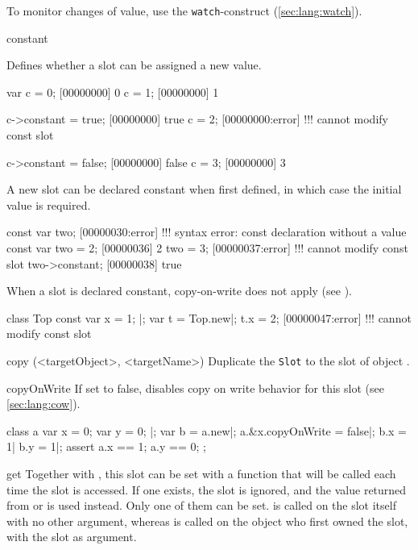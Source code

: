 \begin{urbiscriptapi}
To monitor changes of value, use the \lstinline{watch}-construct
(\autoref{sec:lang:watch}).


\item[constant]

Defines whether a slot can be assigned a new value.

\begin{urbiscript}
var c = 0;
[00000000] 0
c = 1;
[00000000] 1

c->constant = true;
[00000000] true
c = 2;
[00000000:error] !!! cannot modify const slot

c->constant = false;
[00000000] false
c = 3;
[00000000] 3
\end{urbiscript}

A new slot can be declared constant when first defined, in which case the
initial value is required.

\begin{urbiscript}
const var two;
[00000030:error] !!! syntax error: const declaration without a value
const var two = 2;
[00000036] 2
two = 3;
[00000037:error] !!! cannot modify const slot
two->constant;
[00000038] true
\end{urbiscript}

When a slot is declared constant, copy-on-write does not apply (see
).

\begin{urbiscript}
class Top
{
  const var x = 1;
}|;
var t = Top.new|;
t.x = 2;
[00000047:error] !!! cannot modify const slot
\end{urbiscript}


\item[copy](<targetObject>, <targetName>)%
  Duplicate the \lstinline|Slot| to the slot  of object
  .


\item[copyOnWrite]%
  If set to false, disables copy on write behavior for this slot
  (see \autoref{sec:lang:cow}).

\begin{urbiscript}
class a {
  var x = 0;
  var y = 0;
}|;
var b = a.new|;
a.&x.copyOnWrite = false|;
b.x = 1| b.y = 1|;
assert
{
  a.x == 1;
  a.y == 0;
};
\end{urbiscript}


\item[get]%
  Together with , this slot can be set with a function that will
  be called each time the slot
  is accessed. If one exists, the  slot is ignored, and the
  value returned from  or  is used instead.
  Only one of them can be set.  is called on the slot itself with
  no other argument, whereas  is called on the object who first
  owned the slot, with the slot as argument.


\end{urbiscriptapi}
